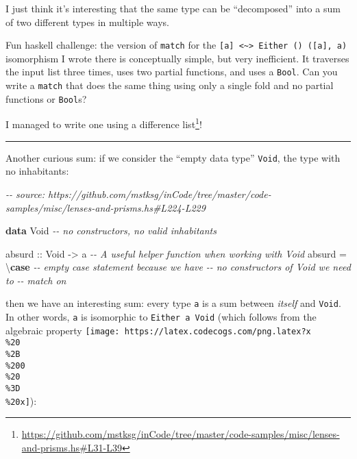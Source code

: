 \documentclass[]{article}
\newenvironment{Shaded}{}{}
\newcommand{\CommentTok}[1]{\textcolor[rgb]{0.38,0.63,0.69}{\textit{#1}}}
\newcommand{\DataTypeTok}[1]{\textcolor[rgb]{0.56,0.13,0.00}{#1}}
\newcommand{\KeywordTok}[1]{\textcolor[rgb]{0.00,0.44,0.13}{\textbf{#1}}}
\newcommand{\NormalTok}[1]{#1}
\newcommand{\OtherTok}[1]{\textcolor[rgb]{0.00,0.44,0.13}{#1}}
\renewcommand{\href}[2]{#2\footnote{\url{#1}}}
\begin{document}
I just think it's interesting that the same type can be ``decomposed'' into a
sum of two different types in multiple ways.

Fun haskell challenge: the version of \texttt{match} for the
\texttt{{[}a{]}\ \textless{}\textasciitilde{}\textgreater{}\ Either\ ()\ ({[}a{]},\ a)}
isomorphism I wrote there is conceptually simple, but very inefficient. It
traverses the input list three times, uses two partial functions, and uses a
\texttt{Bool}. Can you write a \texttt{match} that does the same thing using
only a single fold and no partial functions or \texttt{Bool}s?

I managed to write one
\href{https://github.com/mstksg/inCode/tree/master/code-samples/misc/lenses-and-prisms.hs\#L31-L39}{using
a difference list}!

\begin{center}\rule{0.5\linewidth}{\linethickness}\end{center}

Another curious sum: if we consider the ``empty data type'' \texttt{Void}, the
type with no inhabitants:

\begin{Shaded}
\begin{Highlighting}[]
\CommentTok{{-}{-} source: https://github.com/mstksg/inCode/tree/master/code{-}samples/misc/lenses{-}and{-}prisms.hs\#L224{-}L229}

\KeywordTok{data} \DataTypeTok{Void}           \CommentTok{{-}{-} no constructors, no valid inhabitants}

\OtherTok{absurd ::} \DataTypeTok{Void} \OtherTok{{-}>}\NormalTok{ a     }\CommentTok{{-}{-} A useful helper function when working with \textasciigrave{}Void\textasciigrave{}}
\NormalTok{absurd }\OtherTok{=}\NormalTok{ \textbackslash{}}\KeywordTok{case} \CommentTok{{-}{-} empty case statement because we have}
               \CommentTok{{-}{-} no constructors of \textquotesingle{}Void\textquotesingle{} we need to}
               \CommentTok{{-}{-} match on}
\end{Highlighting}
\end{Shaded}

then we have an interesting sum: every type \texttt{a} is a sum between
\emph{itself} and \texttt{Void}. In other words, \texttt{a} is isomorphic to
\texttt{Either\ a\ Void} (which follows from the algebraic property
\texttt{[image: https://latex.codecogs.com/png.latex?x\\\%20\\\%2B\\\%200\\\%20\\\%3D\\\%20x]}):
\end{document}
